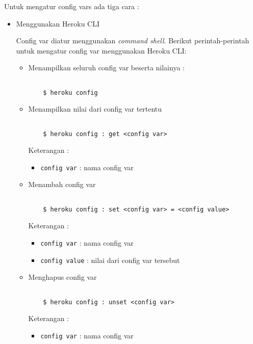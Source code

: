 Untuk mengatur config vars ada tiga cara : 
\begin{itemize}
\item Menggunakan Heroku CLI

Config var diatur menggunakan \textit{command shell}. Berikut perintah-perintah untuk mengatur config var menggunakan Heroku CLI:
\begin{itemize}
\item Menampilkan seluruh config var beserta nilainya : 

\begin{lstlisting}

	$ heroku config

\end{lstlisting}

\item Menampilkan nilai dari config var tertentu 
\begin{lstlisting}

	$ heroku config : get <config var>

\end{lstlisting}
Keterangan :
\begin{itemize}
\item \texttt{config var} : nama config var
\end{itemize}

\item Menambah config var

\begin{lstlisting}

	$ heroku config : set <config var> = <config value>

\end{lstlisting}
Keterangan :
\begin{itemize}
\item \texttt{config var} : nama config var
\item \texttt{config value} : nilai dari config var tersebut
\end{itemize}

\item Menghapus config var

\begin{lstlisting}

	$ heroku config : unset <config var>

\end{lstlisting}
Keterangan :
\begin{itemize}
\item \texttt{config var} : nama config var
\end{itemize}


\end{itemize}
\end{itemize}
